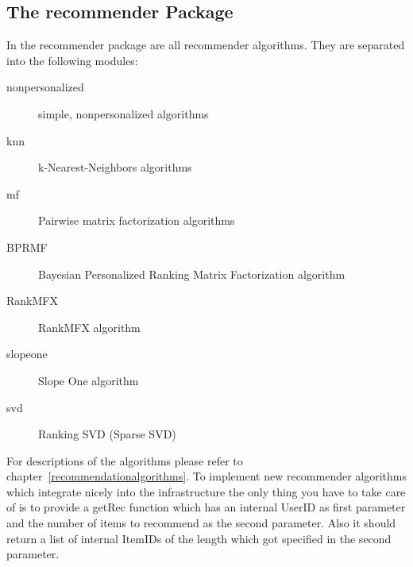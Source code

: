 \subsection*{The recommender Package}
In the recommender package are all recommender algorithms.
They are separated into the following modules:
\begin{description}
\item[nonpersonalized] simple, nonpersonalized algorithms
\item[knn] k-Nearest-Neighbors algorithms
\item[mf] Pairwise matrix factorization algorithms
\item[BPRMF] Bayesian Personalized Ranking Matrix Factorization algorithm
\item[RankMFX] RankMFX algorithm
\item[slopeone] Slope One algorithm
\item[svd] Ranking SVD (Sparse SVD)
\end{description}
For descriptions of the algorithms please refer to chapter~\ref{recommendationalgorithms}.
To implement new recommender algorithms which integrate nicely into the infrastructure
the only thing you have
to take care of is to provide a getRec function which has an 
internal UserID as first parameter and the number of items to recommend
as the second parameter. Also it should return a list of internal ItemIDs of the
length which got specified in the second parameter.
